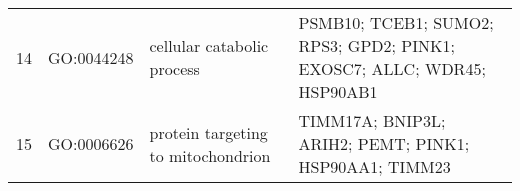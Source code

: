 \begin{table}[htp]
\begin{center}
\begin{tabular}{|c|c|p{1.5in}|p{4in}|}
14 & GO:0044248 & cellular catabolic process & \footnotesize{PSMB10; TCEB1; SUMO2; RPS3; GPD2; PINK1; EXOSC7; ALLC; WDR45; HSP90AB1} \\ 
 15 & GO:0006626 & protein targeting to mitochondrion  & \footnotesize{TIMM17A; BNIP3L; ARIH2; PEMT; PINK1; HSP90AA1; TIMM23} \\ 

\end{tabular}
\end{center}
\end{table}
